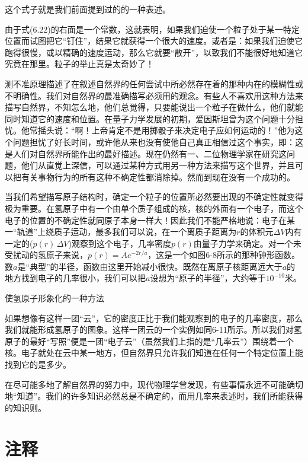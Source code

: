 \documentclass[12pt,oneside]{book}
\begin{document}
\begin{common-format}
这个式子就是我们前面提到过的的一种表述。

由于式(6.22)的右面是一个常数，这就表明，如果我们迫使一个粒子处于某一特定位置而试图把它“钉住”，结果它就获得一个很大的速度。或者是：如果我们迫使它跑得很慢，或以精确的速度运动，那么它就要“散开”，以致我们不能很好地知道它究竟在那里。粒子的举止真是太奇妙了！

测不准原理描述了在叙述自然界的任何尝试中所必然存在着的那种内在的模糊性或不明确性。我们对自然界的最准确描写必须用的观念。有些人不喜欢用这种方法来描写自然界，不知怎么地，他们总觉得，只要能说出一个粒子在做什么，他们就能同时知道它的速度和位置。在量子力学发展的初期，爱因斯坦曾为这个问题十分担忧。他常摇头说：“啊！上帝肯定不是用掷骰子来决定电子应如何运动的！”他为这个问题担忧了好长时间，或许他从来也没有使他自己真正相信过这个事实，即：这是人们对自然界所能作出的最好描述。现在仍然有一、二位物理学家在研究这问题，他们从直觉上深信，可以通过某种方式用另一种方法来描写这个世界，并且可以把有关事物行为的所有这种不确定性都消除掉。然而到现在没有一个成功的。

当我们希望描写原子结构时，确定一个粒子的位置所必然要出现的不确定性就变得极为重要。在氢原子中有一个由单个质子组成的核，核的外面有一个电子，而这个电子的位置的不确定性就同原子本身一样大！因此我们不能严格地说：电子在某一“轨道”上绕质子运动，最多我们可以说，在一个离质子距离为$r$的体积元$\Delta V$内有一定的($p(r)\,\Delta V$)观察到这个电子，几率密度$p(r)$由量子力学来确定。对一个未受扰动的氢原子来说，$p(r)=Ae^{-2r/a}$，这是一个如图6-8所示的那种钟形函数。数$a$是“典型”的半径，函数由这里开始减小很快。既然在离原子核距离远大于$a$的地方找到电子的几率很小，我们可以把$a$设想为“原子的半径”，大约等于$10^{-10}$米。
\begin{fig}[3]{使氢原子形象化的一种方法}
\caption{\footnotesize 使氢原子形象化的一种方法。这里云的密度(洁白度)表示能观察到电子的几率密度}
\label{fig:使氢原子形象化的一种方法}
\end{fig}

如果想像有这样一团“云”，它的密度正比于我们能观察到的电子的几率密度，那么我们就能形成氢原子的图象。这样一团云的一个实例如同6-11所示。所以我们对氢原子的最好“写照”便是一团“电子云”（虽然我们上指的是“几率云”）围绕着一个核。电子就处在云中某一地方，但自然界只允许我们知道在任何一个特定位置上能找到它的是多少。

在尽可能多地了解自然界的努力中，现代物理学曾发现，有些事情永远不可能确切地“知道”。我们的许多知识必然总是不确定的，而用几率来表述时，我们所能获得的知识则。


\section{注释}
\showendnotes

\end{common-format}
\end{document}
